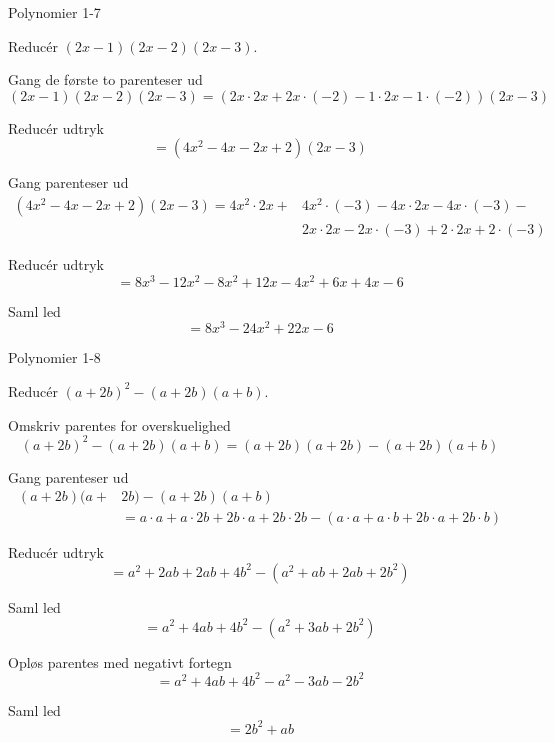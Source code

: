 \documentclass{article}
\begin{document}
\newpage

\begin{exercise}{Polynomier 1-7}
	
	Reducér $(2x-1)(2x-2)(2x-3)$.
	
	
	\hint
	
	Gang de første to parenteser ud
	\[
	(2x-1)(2x-2)(2x-3) = (2x \cdot 2x + 2x \cdot (-2) -1 \cdot 2x -1 \cdot (-2))(2x-3)
	\]
	
	\hint
	
	Reducér udtryk
	\[
	= (4x^2-4x-2x+2)(2x-3)
	\]
	
	\hint

	Gang parenteser ud
	\begin{align*}
	(4x^2-4x-2x+2)(2x-3) = 4x^2 \cdot 2x + &4x^2 \cdot (-3) -4x \cdot 2x -4x \cdot (-3) - \\ 
	&2x \cdot 2x -2x \cdot (-3) + 2 \cdot 2x + 2 \cdot (-3)
	\end{align*}

	\hint

	Reducér udtryk
	\[
	=8x^3 - 12x^2 -8x^2+12x-4x^2 +6x + 4x-6
	\]
	
	
	\hint
	
	Saml led
	\[
	= 8x^3 - 24x^2 + 22x-6
	\]
	
\end{exercise}

\newpage

\begin{exercise}{Polynomier 1-8}
	
	Reducér $(a+2b)^2 - (a+2b)(a+b)$.
	
	
	\hint
	
	Omskriv parentes for overskuelighed
	\[
	(a+2b)^2 - (a+2b)(a+b) = (a+2b)(a+2b) - (a+2b)(a+b)
	\]
	
	
	\hint
	
	Gang parenteser ud
	\begin{align*}
	(a+2b)(a+&2b) - (a+2b)(a+b) \\
	&= a \cdot a + a \cdot 2b + 2b \cdot a + 2b \cdot 2b - (a \cdot a + a \cdot b + 2b \cdot a + 2b \cdot b)
	\end{align*}
	
	\hint
	
	Reducér udtryk
	\[
	= a^2 + 2ab+2ab+4b^2-(a^2+ab+2ab+2b^2) 
	\]
	
	
	\hint
	
	Saml led
	\[
	= a^2 + 4ab + 4b^2 - (a^2 + 3ab + 2b^2)
	\]
	
	\hint
	
	Opløs parentes med negativt fortegn
	\[
	= a^2 + 4ab + 4b^2 - a^2 -3ab -2b^2
	\]
	
	
	\hint
	
	Saml led 
	\[
	= 2b^2 + ab
	\]
	
\end{exercise}
\end{document}

